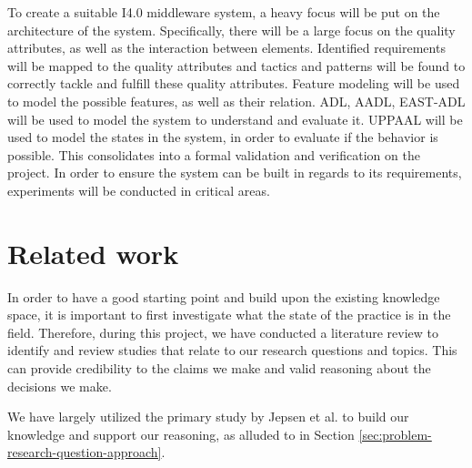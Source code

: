 To create a suitable I4.0 middleware system, a heavy focus will be put on the architecture of the system. Specifically, there will be a large focus on the quality attributes, as well as the interaction between elements. Identified requirements will be mapped to the quality attributes and tactics and patterns will be found to correctly tackle and fulfill these quality attributes. Feature modeling will be used to model the possible features, as well as their relation. ADL, AADL, EAST-ADL will be used to model the system to understand and evaluate it. UPPAAL will be used to model the states in the system, in order to evaluate if the behavior is possible. This consolidates into a formal validation and verification on the project.
In order to ensure the system can be built in regards to its requirements, experiments will be conducted in critical areas.

\section{Related work}
\label{sec:related-work}
In order to have a good starting point and build upon the existing knowledge space, it is important to first investigate what the state of the practice is in the field. Therefore, during this project, we have conducted a literature review to identify and review studies that relate to our research questions and topics. This can provide credibility to the claims we make and valid reasoning about the decisions we make. 



We have largely utilized the primary study by Jepsen et al. \cite{Jepsen2020} to build our knowledge and support our reasoning, as alluded to in Section \ref{sec:problem-research-question-approach}.


